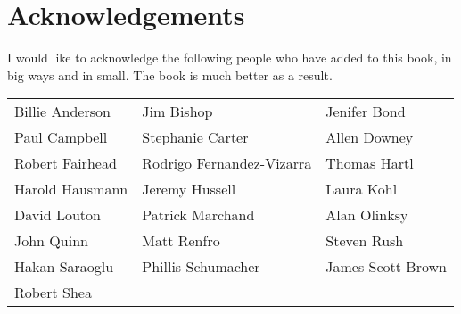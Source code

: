 
    \chapter*{Acknowledgements}
    \thispagestyle{empty}

    I would like to acknowledge the following people who have added to this book, in big ways and in small.  The book is much better as a result. 

    \vspace{.5in}

    \begin{doublespace}
    \begin{tabular}{p{2in}p{2in}p{2in}}
    Billie Anderson&Jim Bishop&Jenifer Bond\\
Paul Campbell&Stephanie Carter&Allen Downey\\
Robert Fairhead&Rodrigo Fernandez-Vizarra&Thomas Hartl\\
Harold Hausmann&Jeremy Hussell&Laura Kohl\\
David Louton&Patrick Marchand&Alan Olinksy\\
John Quinn&Matt Renfro&Steven Rush\\
Hakan Saraoglu&Phillis Schumacher&James Scott-Brown\\
Robert Shea&
     \end{tabular}
    \end{doublespace}
    